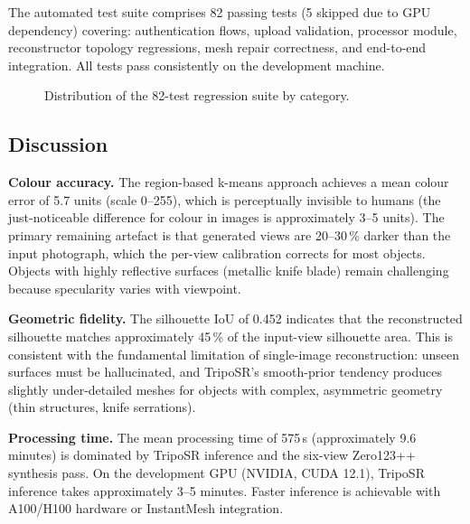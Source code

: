 \documentclass[conference]{IEEEtran}
\begin{document}
The automated test suite comprises 82 passing tests (5 skipped due to GPU dependency) covering:
authentication flows, upload validation, processor module, reconstructor topology regressions,
mesh repair correctness, and end-to-end integration. All tests pass consistently on the development machine.

\begin{figure}[htbp]
\centering
{}
\caption{Distribution of the 82-test regression suite by category.}
\label{fig:tests}
\end{figure}

\subsection{Discussion}

\textbf{Colour accuracy.}
The region-based k-means approach achieves a mean colour error of 5.7 units (scale 0--255), which is perceptually
invisible to humans (the just-noticeable difference for colour in images is approximately 3--5 units). The primary
remaining artefact is that generated views are 20--30\,\% darker than the input photograph, which the per-view
calibration corrects for most objects. Objects with highly reflective surfaces (metallic knife blade) remain
challenging because specularity varies with viewpoint.

\textbf{Geometric fidelity.}
The silhouette IoU of 0.452 indicates that the reconstructed silhouette matches approximately 45\,\% of the
input-view silhouette area. This is consistent with the fundamental limitation of single-image reconstruction:
unseen surfaces must be hallucinated, and TripoSR's smooth-prior tendency produces slightly under-detailed
meshes for objects with complex, asymmetric geometry (thin structures, knife serrations).

\textbf{Processing time.}
The mean processing time of 575\,s (approximately 9.6 minutes) is dominated by TripoSR inference and the
six-view Zero123++ synthesis pass. On the development GPU (NVIDIA, CUDA 12.1), TripoSR inference takes
approximately 3--5 minutes. Faster inference is achievable with A100/H100 hardware or InstantMesh integration.
\end{document}
